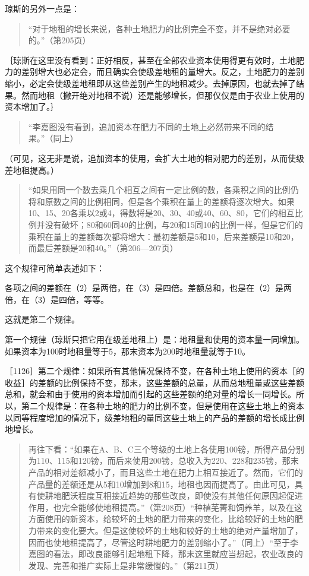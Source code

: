 琼斯的另外一点是：

\begin{quote}{“对于地租的增长来说，各种土地肥力的比例完全不变，并不是绝对必要的。”（第205页）}\end{quote}

｛琼斯在这里没有看到：正好相反，甚至在全部农业资本使用得更有效时，土地肥力的差别增大也必定会，而且确实会使级差地租的量增大。反之，土地肥力的差别缩小，必定会使级差地租即从这些差别产生的地租减少。去掉原因，也就去掉了结果。然而地租（撇开绝对地租不说）还是能够增长，但那仅仅是由于农业上使用的资本增加了。｝

\begin{quote}{“李嘉图没有看到，追加资本在肥力不同的土地上必然带来不同的结果。”（同上）}\end{quote}

（可见，这无非是说，追加资本的使用，会扩大土地的相对肥力的差别，从而使级差地租提高。）

\begin{quote}{“如果用同一个数去乘几个相互之间有一定比例的数，各乘积之间的比例仍将和原数之间的比例相同，但是各个乘积在量上的差额将逐次增大。如果10、15、20各乘以2或4，得数将是20、30、40或40、60、80，它们的相互比例并没有破坏；80和60同40的比例，与20和15同10的比例一样，但是它们的乘积在量上的差额每次都将增大：最初差额是5和10，后来差额是10和20，而最后差额是20和40。”（第206—207页）}\end{quote}

这个规律可简单表述如下：

\todo{}

各项之间的差额在（2）是两倍，在（3）是四倍。差额总和，也是在（2）是两倍，在（3）是四倍，等等。

这就是第二个规律。

第一个规律（琼斯只把它用在级差地租上）是：地租量和使用的资本量一同增加。如果资本为100时地租量等于5，那末资本为200时地租量就等于10。

［1126］第二个规律：如果所有其他情况保持不变，在各种土地上使用的资本［的收益］的差额的比例保持不变，那末，这些差额的总量，从而总地租量或这些差额总和，就会和由于使用的资本增加而引起的这些差额的绝对量的增长一同增长。所以，第二个规律是：在各种土地的肥力的比例不变，但是使用在这些土地上的资本以同等程度增加的情况下，级差地租的量同这些土地上的产品的差额的增长成比例地增长。

\begin{quote}{再往下看：“如果在A、B、C三个等级的土地上各使用100镑，所得产品分别为110、115和120镑，而后来使用200镑，总收入为220、228和235镑，那末产品的相对差额减小了，而且这些土地在肥力上相互接近了。然而，它们的产品量的差额还是从5和10增加到8和15，地租也因而提高了。由此可见，具有使耕地肥沃程度互相接近趋势的那些改良，即使没有其他任何原因起促进作用，也完全能够使地租提高。”（第208页）“种植芜菁和饲养羊，以及在这方面使用的新资本，给较坏的土地的肥力带来的变化，比给较好的土地的肥力带来的变化要大。但是这使较坏的土地和较好的土地的绝对产量增加了，因而也使地租提高了，尽管这时耕地肥力的差别缩小了。”（同上）“至于李嘉图的看法，即改良能够引起地租下降，那末这里就应当想起，农业改良的发现、完善和推广实际上是非常缓慢的。”（第211页）}\end{quote}

